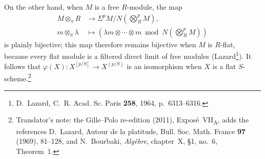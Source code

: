 On the other hand, when \(M\) is a free \(R\)-module, the map
\[
\begin{aligned}
  M\otimes_\pi R
  &\longrightarrow
  \Sigma^p M\big/
    N\!\left(\bigotimes_R^p M\right), \\
  m\otimes_\pi\lambda
  &\longmapsto
  \left(
    \lambda m\otimes\cdots\otimes m
    \bmod
    N\!\left(\bigotimes_R^p M\right)
  \right)
\end{aligned}
\]
is plainly bijective; this map therefore remains bijective when \(M\)
is \(R\)-flat, because every flat module is a filtered direct limit of
free modules (Lazard\footnote{D.~Lazard, C.~R. Acad. Sc. Paris
\textbf{258}, 1964, p.~6313--6316.}). It follows that
\(\varphi(X):X^{[p/S]}\to X^{(p/S)}\) is an isomorphism when \(X\) is a
flat \(S\)-scheme.\footnote{Translator's note: the Gille--Polo
re-edition (2011), Expos\'e~VII\textsubscript{A}, adds the references
D.~Lazard, Autour de la platitude, Bull. Soc. Math. France \textbf{97}
(1969), 81--128, and N.~Bourbaki, \textit{Alg\`ebre}, chapter~X, \S1,
no.~6, Theorem~1.}

